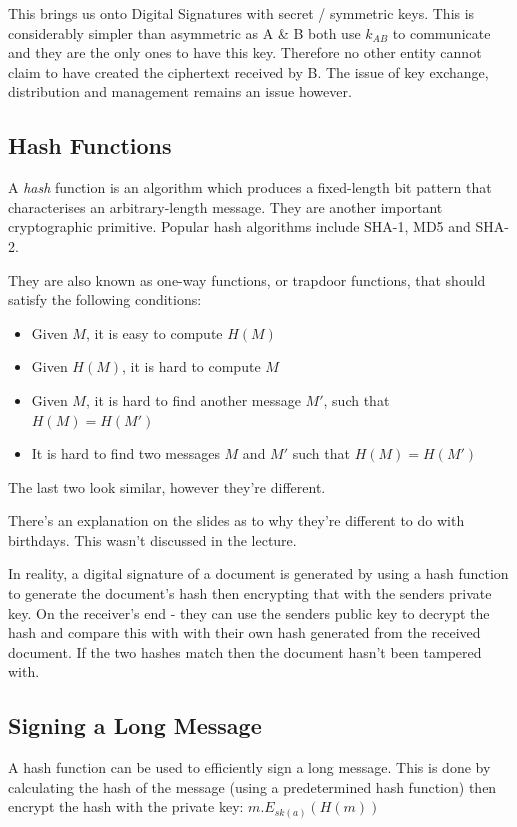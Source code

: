 This brings us onto Digital Signatures with secret / symmetric keys. This is considerably simpler than asymmetric as A \& B both use $k_{AB}$ to communicate and they are the only ones to have this key. Therefore no other entity cannot claim to have created the ciphertext received by B. The issue of key exchange, distribution and management remains an issue however.

\subsection{Hash Functions}
A \textit{hash} function is an algorithm which produces a fixed-length bit pattern that characterises an arbitrary-length message. They are another important cryptographic primitive. Popular hash algorithms include SHA-1, MD5 and SHA-2. 

They are also known as one-way functions, or trapdoor functions, that should satisfy the following conditions:
\begin{itemize}
    \item Given $M$, it is easy to compute $H(M)$
    \item Given $H(M)$, it is hard to compute $M$
    \item Given $M$, it is hard to find another message $M'$, such that $H(M) = H(M')$
    \item It is hard to find two messages $M$ and $M'$ such that $H(M) = H(M')$
\end{itemize}

The last two look similar, however they're different. 

\begin{extlink}
There's an explanation on the slides as to why they're different to do with birthdays. This wasn't discussed in the lecture.
\end{extlink}

In reality, a digital signature of a document is generated by using a hash function to generate the document's hash then encrypting that with the senders private key. On the receiver's end - they can use the senders public key to decrypt the hash and compare this with with their own hash generated from the received document. If the two hashes match then the document hasn't been tampered with.

\subsection{Signing a Long Message}
A hash function can be used to efficiently sign a long message. This is done by calculating the hash of the message (using a predetermined hash function) then encrypt the hash with the private key: $m.E_{sk(a)} (H(m))$

